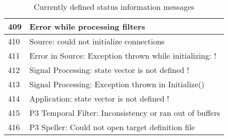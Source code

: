 \begin{table}[ht]
\begin{tabular}{|l|l|}
  \hline
  409 & Error while processing filters \\
  \hline
  410 & Source: could not initialize connections \\
  \hline
  411 & Error in Source: Exception thrown while initializing: !\\
  \hline
  412 & Signal Processing: state vector is not defined ! \\
  \hline
  413 & Signal Processing: Exception thrown in Initialize() \\
  \hline
  414 & Application: state vector is not defined ! \\
  \hline
  415 & P3 Temporal Filter: Inconsistency or ran out of buffers \\
  \hline
  416 & P3 Speller: Could not open target definition file \\
  \hline
 \end{tabular}
 \caption{Currently defined status information messages}
 \label{stat_info_mess}
\end{table}   

